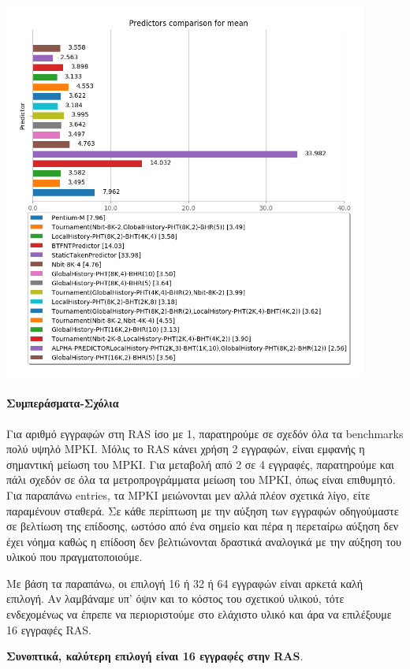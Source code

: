    \begin{minipage}{\textwidth}
      \begin{center}
         \\
         \vspace{3mm}
         \includegraphics[width=0.9\textwidth, frame]{./graphs/4-5/mean.png}
         \vspace{6mm}
      \end{center}
   \end{minipage}

\paragraph{Συμπεράσματα-Σχόλια}
   

   Για αριθμό εγγραφών στη RAS ίσο με 1, παρατηρούμε σε σχεδόν όλα τα benchmarks
   πολύ υψηλό MPKI. Μόλις το RAS κάνει χρήση 2 εγγραφών, είναι εμφανής η
   σημαντική μείωση του MPKI. Για μεταβολή από 2 σε 4 εγγραφές, παρατηρούμε και
   πάλι σχεδόν σε όλα τα μετροπρογράμματα μείωση του MPKI, όπως είναι επιθυμητό.
   Για παραπάνω entries, τα MPKI μειώνονται μεν αλλά πλέον σχετικά λίγο, είτε
   παραμένουν σταθερά. Σε κάθε περίπτωση με την αύξηση των εγγραφών οδηγούμαστε
   σε βελτίωση της επίδοσης, ωστόσο από ένα σημείο και πέρα η περεταίρω αύξηση
   δεν έχει νόημα καθώς η επίδοση δεν βελτιώνονται δραστικά αναλογικά με την
   αύξηση του υλικού που πραγματοποιούμε. 

   Με βάση τα παραπάνω, οι επιλογή 16 ή 32 ή 64 εγγραφών είναι αρκετά καλή
   επιλογή. Αν λαμβάναμε υπ’ όψιν και το κόστος του σχετικού υλικού, τότε
   ενδεχομένως να έπρεπε να περιοριστούμε στο ελάχιστο υλικό και άρα να
   επιλέξουμε 16 εγγραφές RAS.
   
   \textbf{Συνοπτικά, καλύτερη επιλογή είναι 16 εγγραφές στην RAS}.